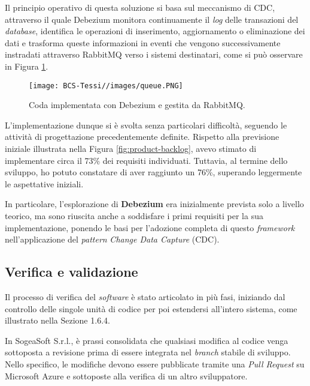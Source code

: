         \vspace{0.2 em}
        \noindent Il principio operativo di questa soluzione si basa sul meccanismo di CDC, attraverso il quale Debezium monitora continuamente il \textit{log} delle transazioni del \textit{database}, identifica le operazioni di inserimento, aggiornamento o eliminazione dei dati e trasforma queste informazioni in eventi che vengono successivamente instradati attraverso RabbitMQ verso i sistemi destinatari, come si può osservare in Figura \ref{fig:queue}.

        \begin{figure}[H]
            \centering
            \texttt{[image: BCS-Tessi//images/queue.PNG]}
            \caption{Coda implementata con Debezium e gestita da RabbitMQ.}
            \label{fig:queue}
        \end{figure}

        \noindent L'implementazione dunque si è svolta senza particolari difficoltà, seguendo le attività di progettazione precedentemente definite. Rispetto alla previsione iniziale illustrata nella Figura \ref{fig:product-backlog}, avevo stimato di implementare circa il 73\% dei requisiti individuati. Tuttavia, al termine dello sviluppo, ho potuto constatare di aver raggiunto un 76\%, superando leggermente le aspettative iniziali.  

        \vspace{0.2 em}
        \noindent In particolare, l'esplorazione di \textbf{Debezium} era inizialmente prevista solo a livello teorico, ma sono riuscita anche a soddisfare i primi requisiti per la sua implementazione, ponendo le basi per l'adozione completa di questo \textit{framework} nell'applicazione del \textit{pattern} \textit{Change Data Capture} (CDC). 

        
        \subsection{Verifica e validazione}
        Il processo di verifica del \textit{software} è stato articolato in più fasi, iniziando dal controllo delle singole unità di codice per poi estendersi all’intero sistema, come illustrato nella Sezione 1.6.4.  

        \vspace{0.2 em}
        \noindent In SogeaSoft S.r.l., è prassi consolidata che qualsiasi modifica al codice venga sottoposta a revisione prima di essere integrata nel \textit{branch} stabile di sviluppo. Nello specifico, le modifiche devono essere pubblicate tramite una \textit{Pull Request} su Microsoft Azure e sottoposte alla verifica di un altro sviluppatore.

